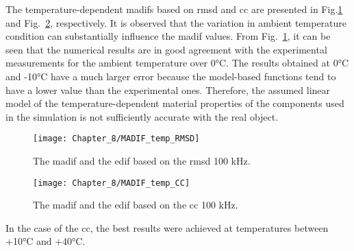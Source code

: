 The temperature-dependent \acp{madif} based on \ac{rmsd} and \ac{cc} are presented in Fig.\ref{fig:madif_temp_rmsd} and Fig.~\ref{fig:madif_temp_cc}, respectively.
It is observed that the variation in ambient temperature condition can substantially influence the \ac{madif} values.
From Fig.~\ref{fig:madif_temp_rmsd}, it can be seen that the numerical results are in good agreement with the experimental measurements for the ambient temperature over 0\unit{\degreeCelsius}.
The results obtained at 0\unit{\degreeCelsius} and -10\unit{\degreeCelsius} have a much larger error because the model-based functions tend to have a lower value than the experimental ones.
Therefore, the assumed linear model of the temperature-dependent material properties of the components used in the simulation is not sufficiently accurate with the real object.
\begin{figure}[!tbh]
	\begin{center}
		\texttt{[image: Chapter\_8/MADIF\_temp\_RMSD]}
	\end{center}
	\caption{The \acf{madif} and the \acf{edif} based on the \acf{rmsd} 100 \unit{\kHz}.}
	\label{fig:madif_temp_rmsd}
\end{figure}
\begin{figure}
	\begin{center}
		\texttt{[image: Chapter\_8/MADIF\_temp\_CC]}
	\end{center}
	\caption{The \acf{madif} and the \acf{edif} based on the \acf{cc} 100 \unit{\kHz}.}
	\label{fig:madif_temp_cc}
\end{figure}
In the case of the \ac{cc}, the best results were achieved at temperatures between +10\unit{\degreeCelsius} and +40\unit{\degreeCelsius}. 